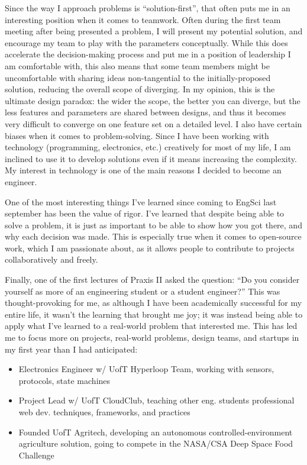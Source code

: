 \documentclass{report}
\begin{document}
Since the way I approach problems is “solution-first”, that often puts 
me in an interesting position when it comes to teamwork. Often during 
the first team meeting after being presented a problem, I will present 
my potential solution, and encourage my team to play with the parameters 
conceptually. While this does accelerate the decision-making process and 
put me in a position of leadership I am comfortable with, this also means 
that some team members might be uncomfortable with sharing ideas non-tangential 
to the initially-proposed solution, reducing the overall scope of diverging. 
In my opinion, this is the ultimate design paradox: the wider the scope, 
the better you can diverge, but the less features and parameters are 
shared between designs, and thus it becomes very difficult to converge 
on one feature set on a detailed level.
\pagebreak
I also have certain biases when it comes to problem-solving. Since I have 
been working with technology (programming, electronics, etc.) creatively 
for most of my life, I am inclined to use it to develop solutions even 
if it means increasing the complexity. My interest in technology is one 
of the main reasons I decided to become an engineer.

One of the most interesting things I’ve learned since coming to EngSci 
last september has been the value of rigor. I’ve learned that despite being 
able to solve a problem, it is just as important to be able to show how 
you got there, and why each decision was made. This is especially true when 
it comes to open-source work, which I am passionate about, as it allows 
people to contribute to projects collaboratively and freely.

Finally, one of the first lectures of Praxis II asked the question: “Do you 
consider yourself as more of an engineering student or a student engineer?” 
This was thought-provoking for me, as although I have been academically 
successful for my entire life, it wasn’t the learning that brought me joy; 
it was instead being able to apply what I’ve learned to a real-world problem 
that interested me. This has led me to focus more on projects, real-world 
problems, design teams, and startups in my first year than I had anticipated:
\begin{itemize}
    \item Electronics Engineer w/ UofT Hyperloop Team, working with sensors, 
    protocols, state machines
    \item Project Lead w/ UofT CloudClub, teaching other eng. students professional 
    web dev. techniques, frameworks, and practices
    \item Founded UofT Agritech, developing an autonomous controlled-environment 
    agriculture solution, going to compete in the NASA/CSA Deep Space Food Challenge
\end{itemize}
\end{document}
